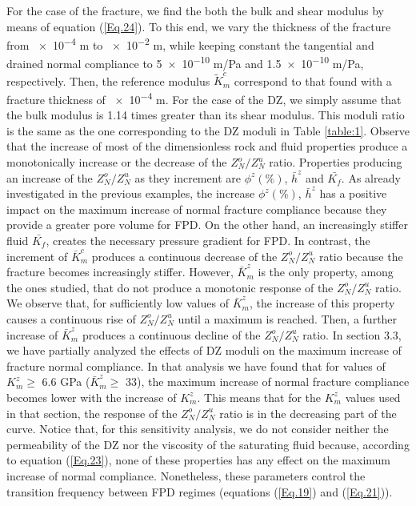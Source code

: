 \documentclass[draft]{agujournal2019}
\begin{document}
For the case of the fracture, we find the both the bulk and shear modulus by means of equation (\ref{Eq.24}). To this end, we vary the thickness of the fracture from \num{e-4} m to \num{e-2} m, while keeping constant the tangential and drained normal compliance to \num{5e-10} m/Pa and \num{1.5e-10} m/Pa, respectively. Then, the reference modulus $\tilde{K}_m^c$ correspond to that found with a fracture thickness of \num{e-4} m. For the case of the DZ, we simply assume that the bulk modulus is 1.14 times greater than its shear modulus. This moduli ratio is the same as the one corresponding to the DZ moduli in Table \ref{table:1}. Observe that the increase of most of the dimensionless rock and fluid properties produce a monotonically increase or the decrease of the $Z_N^o/Z_N^u$ ratio. Properties producing an increase of the $Z_N^o/Z_N^u$ as they increment are $\phi^z (\%)$, $\bar{h}^z$ and $\bar{K_f}$. As already investigated in the previous examples, the increase $\phi^z (\%)$, $\bar{h}^z$ has a positive impact on the maximum increase of normal fracture compliance because they provide a greater pore volume for FPD. On the other hand, an increasingly stiffer fluid $\bar{K_f}$, creates the necessary pressure gradient for FPD.
In contrast, the increment of $\bar{K}_m^c$ produces a continuous decrease of the $Z_N^o/Z_N^u$ ratio because the fracture becomes increasingly stiffer. However,  $\bar{K}_m^z$  is the only property, among the ones studied, that do not produce a monotonic response of the  $Z_N^o/Z_N^u$ ratio. We observe that, for sufficiently low values of $\bar{K}_m^z$, the increase of this property causes a continuous rise of  $Z_N^o/Z_N^u$ until a maximum  is reached. Then, a further increase of $\bar{K}_m^z$ produces a continuous decline of the $Z_N^o/Z_N^u$ ratio. In section 3.3, we have partially analyzed the effects of DZ moduli on the maximum increase of fracture normal compliance.
In that analysis we have found that for values of  $K_m^z \geq$ 6.6 GPa ($\bar{K}_m^z \geq$ 33), the maximum increase of normal fracture compliance becomes lower with the increase of  $K_m^z$. This  means that for the $K_m^z$  values used in that section, the response of the $Z_N^o/Z_N^u$  ratio is in the decreasing part of the curve.
Notice that, for this sensitivity analysis, we do not consider neither the permeability of the DZ nor the viscosity of the saturating fluid because, according to equation (\ref{Eq.23}),  none of these properties has any effect on the maximum increase of normal compliance. Nonetheless, these parameters control the transition frequency between FPD regimes (equations (\ref{Eq.19}) and (\ref{Eq.21})).
\end{document}
